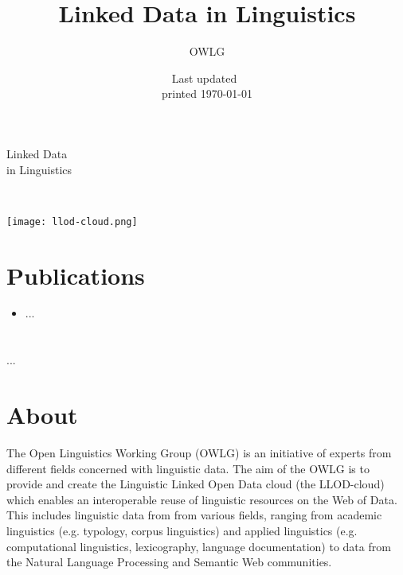 \documentclass[
notumble,
nofoldmark,
]{leaflet}
\title{Linked Data in Linguistics}
\author{%
  OWLG}
\date{Last updated~\docdate\\printed \today}
\begin{document}
%
\thispagestyle{empty}
 
 

\vspace*{12cm}

\hspace*{-6mm}
\parbox{\textwidth}{
\sffamily
\parbox{\textwidth}{\Huge Linked Data \\ in Linguistics}\\ 
}
 

\newpage %
\texttt{[image: llod-cloud.png]}
\section{Publications}
\begin{itemize}
\item ...
\end{itemize} 

\newpage %
\vspace*{12.35cm} 
 \section{} %
 \parbox{\textwidth}{
...
 }

\newpage  %

\section{About}
The Open Linguistics Working Group (OWLG) is an initiative of experts from different fields concerned with linguistic data. 
The aim of the OWLG is to provide and create the Linguistic Linked Open Data cloud (the LLOD-cloud) which enables an interoperable reuse of linguistic resources on the Web of Data.
This includes linguistic data from from various fields, ranging from academic linguistics (e.g. typology, corpus linguistics) and applied linguistics (e.g. computational linguistics, lexicography, language documentation) to data from the Natural Language Processing and Semantic Web communities. 
\end{document}
